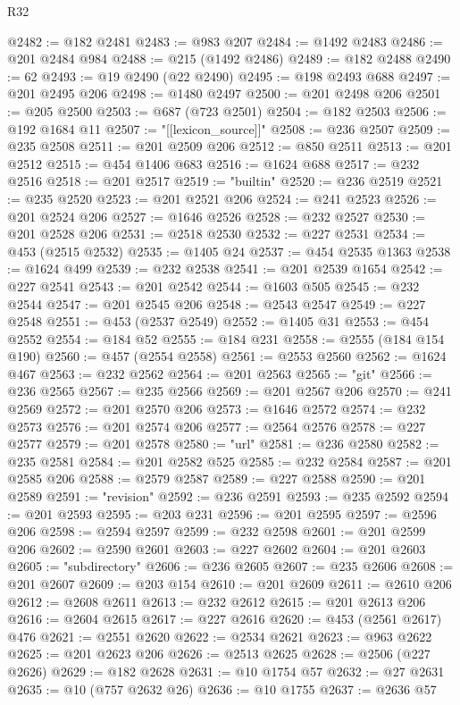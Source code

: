 \begin{lexlean}{R32}
\begin{coremodule}
@2482 := @182 @2481
@2483 := @983 @207
@2484 := @1492 @2483
@2486 := @201 @2484 @984
@2488 := @215 (@1492 @2486)
@2489 := @182 @2488
@2490 := 62
@2493 := @19 @2490 (@22 @2490)
@2495 := @198 @2493 @688
@2497 := @201 @2495 @206
@2498 := @1480 @2497
@2500 := @201 @2498 @206
@2501 := @205 @2500
@2503 := @687 (@723 @2501)
@2504 := @182 @2503
@2506 := @192 @1684 @11
@2507 := "[[lexicon_source]]"
@2508 := @236 @2507
@2509 := @235 @2508
@2511 := @201 @2509 @206
@2512 := @850 @2511
@2513 := @201 @2512
@2515 := @454 @1406 @683
@2516 := @1624 @688
@2517 := @232 @2516
@2518 := @201 @2517
@2519 := "builtin"
@2520 := @236 @2519
@2521 := @235 @2520
@2523 := @201 @2521 @206
@2524 := @241 @2523
@2526 := @201 @2524 @206
@2527 := @1646 @2526
@2528 := @232 @2527
@2530 := @201 @2528 @206
@2531 := @2518 @2530
@2532 := @227 @2531
@2534 := @453 (@2515 @2532)
@2535 := @1405 @24
@2537 := @454 @2535 @1363
@2538 := @1624 @499
@2539 := @232 @2538
@2541 := @201 @2539 @1654
@2542 := @227 @2541
@2543 := @201 @2542
@2544 := @1603 @505
@2545 := @232 @2544
@2547 := @201 @2545 @206
@2548 := @2543 @2547
@2549 := @227 @2548
@2551 := @453 (@2537 @2549)
@2552 := @1405 @31
@2553 := @454 @2552
@2554 := @184 @52
@2555 := @184 @231
@2558 := @2555 (@184 @154 @190)
@2560 := @457 (@2554 @2558)
@2561 := @2553 @2560
@2562 := @1624 @467
@2563 := @232 @2562
@2564 := @201 @2563
@2565 := "git"
@2566 := @236 @2565
@2567 := @235 @2566
@2569 := @201 @2567 @206
@2570 := @241 @2569
@2572 := @201 @2570 @206
@2573 := @1646 @2572
@2574 := @232 @2573
@2576 := @201 @2574 @206
@2577 := @2564 @2576
@2578 := @227 @2577
@2579 := @201 @2578
@2580 := "url"
@2581 := @236 @2580
@2582 := @235 @2581
@2584 := @201 @2582 @525
@2585 := @232 @2584
@2587 := @201 @2585 @206
@2588 := @2579 @2587
@2589 := @227 @2588
@2590 := @201 @2589
@2591 := "revision"
@2592 := @236 @2591
@2593 := @235 @2592
@2594 := @201 @2593
@2595 := @203 @231
@2596 := @201 @2595
@2597 := @2596 @206
@2598 := @2594 @2597
@2599 := @232 @2598
@2601 := @201 @2599 @206
@2602 := @2590 @2601
@2603 := @227 @2602
@2604 := @201 @2603
@2605 := "subdirectory"
@2606 := @236 @2605
@2607 := @235 @2606
@2608 := @201 @2607
@2609 := @203 @154
@2610 := @201 @2609
@2611 := @2610 @206
@2612 := @2608 @2611
@2613 := @232 @2612
@2615 := @201 @2613 @206
@2616 := @2604 @2615
@2617 := @227 @2616
@2620 := @453 (@2561 @2617) @476
@2621 := @2551 @2620
@2622 := @2534 @2621
@2623 := @963 @2622
@2625 := @201 @2623 @206
@2626 := @2513 @2625
@2628 := @2506 (@227 @2626)
@2629 := @182 @2628
@2631 := @10 @1754 @57
@2632 := @27 @2631
@2635 := @10 (@757 @2632 @26)
@2636 := @10 @1755
@2637 := @2636 @57

\end{coremodule}
\end{lexlean}

